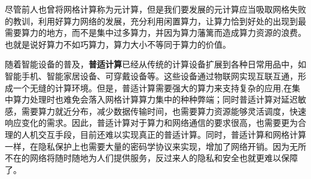 \documentclass[a4paper,twoside]{scrbook}
\begin{document}
尽管前人也曾将网格计算称为元计算，但是我们要发展的元计算应当吸取网格失败的教训，利用好算力网络的发展，充分利用闲置算力，让算力恰到好处的出现到最需要算力的地方，而不是集中过多算力，并因为算力藩篱而造成算力资源的浪费。也就是说好算力不如巧算力，算力大小不等同于算力的价值。

随着智能设备的普及，\textbf{普适计算}已经从传统的计算设备扩展到各种日常用品中，如智能手机、智能家居设备、可穿戴设备等。这些设备通过物联网实现互联互通，形成一个无缝的计算环境。但是，普适计算需要强大的算力来支持复杂的应用,在集中算力处理时也难免会落入网格计算算力集中的种种弊端；同时普适计算对延迟敏感，需要算力就近分布，减少数据传输时间，也需要算力资源能够灵活调度，快速响应变化的需求。因此，普适计算对于算力和网络通信的要求很高，也需要更为合理的人机交互手段，目前还难以实现真正的普适计算。同时，普适计算和网格计算一样，在隐私保护上也需要大量的密码学协议来实现，增加了网络开销。因为无所不在的网络将随时随地为人们提供服务，反过来人的隐私和安全也就更难以保障了。
\end{document}
